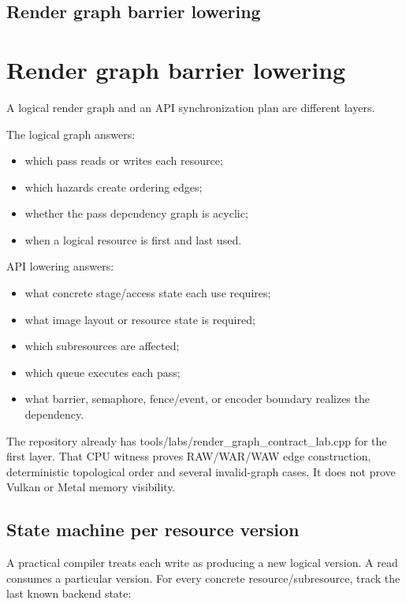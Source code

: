 \hypertarget{appendix-0fc95374cb7e}{}
\section*{Render graph barrier lowering}
\chapter{Render graph barrier lowering}\label{appendix-0fc95374cb7e-render-graph-barrier-lowering}

A logical render graph and an API synchronization plan are different layers.

The logical graph answers:

\begin{itemize}
\tightlist
\item
  which pass reads or writes each resource;
\item
  which hazards create ordering edges;
\item
  whether the pass dependency graph is acyclic;
\item
  when a logical resource is first and last used.
\end{itemize}

API lowering answers:

\begin{itemize}
\tightlist
\item
  what concrete stage/access state each use requires;
\item
  what image layout or resource state is required;
\item
  which subresources are affected;
\item
  which queue executes each pass;
\item
  what barrier, semaphore, fence/event, or encoder boundary realizes the dependency.
\end{itemize}

The repository already has tools/labs/render\_graph\_contract\_lab.cpp for the first layer. That CPU witness proves RAW/WAR/WAW edge construction, deterministic topological order and several invalid-graph cases. It does not prove Vulkan or Metal memory visibility.

\section{State machine per resource version}\label{appendix-0fc95374cb7e-state-machine-per-resource-version}

A practical compiler treats each write as producing a new logical version. A read consumes a particular version. For every concrete resource/subresource, track the last known backend state:

